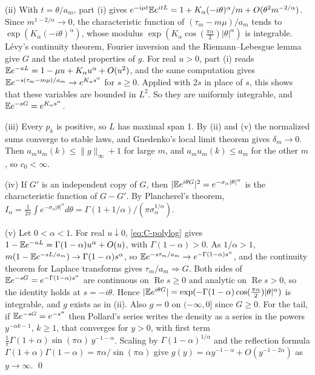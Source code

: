 (ii) With $t=\theta/a_m$, part (i) gives
$e^{-i\mu t}\mathbb{E} e^{itL}=1+K_\alpha(-i\theta)^\alpha/m+O(\theta^2m^{-2/\alpha})$.
Since $m^{1-2/\alpha}\to0$, the characteristic function of $(\tau_m-m\mu)/a_m$
tends to $\exp(K_\alpha(-i\theta)^\alpha)$, whose modulus
$\exp(K_\alpha\cos(\frac{\pi\alpha}2)\lvert\theta\rvert^\alpha)$ is
integrable. L\'evy's continuity theorem, Fourier inversion and the
Riemann--Lebesgue lemma give $G$ and the stated properties of $g$. For real
$u>0$, part (i) reads $\mathbb{E} e^{-uL}=1-\mu u+K_\alpha u^\alpha+O(u^2)$, and the
same computation gives $\mathbb{E} e^{-s(\tau_m-m\mu)/a_m}\to e^{K_\alpha s^\alpha}$
for $s\ge0$. Applied with $2s$ in place of $s$, this shows that these
variables are bounded in $L^2$. So they are uniformly integrable, and
$\mathbb{E} e^{-sG}=e^{K_\alpha s^\alpha}$.

(iii) Every $p_k$ is positive, so $L$ has maximal span 1. By (ii) and (v) the
normalized sums converge to stable laws, and Gnedenko's local limit theorem
\cite[Theorem~4.2.1]{ibragimovlinnik1971} gives $\delta_m\to0$. Then
$a_mu_m(k)\le\lVert g\rVert_\infty+1$ for large $m$, and $a_mu_m(k)\le a_m$
for the other $m$, so $c_0<\infty$.

(iv) If $G'$ is an independent copy of $G$, then
$\lvert\mathbb{E} e^{i\theta G}\rvert^2=e^{-\sigma_\alpha\lvert\theta\rvert^\alpha}$
is the characteristic function of $G-G'$. By Plancherel's theorem,
$I_\alpha=\frac1{2\pi}\int e^{-\sigma_\alpha\lvert\theta\rvert^\alpha}d\theta
=\Gamma(1+1/\alpha)/(\pi\sigma_\alpha^{1/\alpha})$.

(v) Let $0<\alpha<1$. For real $u\downarrow0$, \eqref{eq:C-polylog} gives
$1-\mathbb{E} e^{-uL}=\Gamma(1-\alpha)u^\alpha+O(u)$, with $\Gamma(1-\alpha)>0$. As
$1/\alpha>1$, $m(1-\mathbb{E} e^{-sL/a_m})\to\Gamma(1-\alpha)s^\alpha$, so
$\mathbb{E} e^{-s\tau_m/a_m}\to e^{-\Gamma(1-\alpha)s^\alpha}$, and the continuity
theorem for Laplace transforms gives $\tau_m/a_m\Rightarrow G$. Both sides of
$\mathbb{E} e^{-sG}=e^{-\Gamma(1-\alpha)s^\alpha}$ are continuous on
$\operatorname{Re}s\ge0$ and analytic on $\operatorname{Re}s>0$, so the
identity holds at $s=-i\theta$. Hence
$\lvert\mathbb{E} e^{i\theta G}\rvert=\exp(-\Gamma(1-\alpha)\cos(\frac{\pi\alpha}2)\lvert\theta\rvert^\alpha)$
is integrable, and $g$ exists as in (ii). Also $g=0$ on $(-\infty,0]$ since
$G\ge0$. For the tail, if $\mathbb{E} e^{-sG}=e^{-s^\alpha}$ then Pollard's series
\cite{pollard1946} writes the density as a series in the powers
$y^{-\alpha k-1}$, $k\ge1$, that converges for $y>0$, with first term
$\frac1\pi\Gamma(1+\alpha)\sin(\pi\alpha)\,y^{-1-\alpha}$. Scaling by
$\Gamma(1-\alpha)^{1/\alpha}$ and the reflection formula
$\Gamma(1+\alpha)\Gamma(1-\alpha)=\pi\alpha/\sin(\pi\alpha)$ give
$g(y)=\alpha y^{-1-\alpha}+O(y^{-1-2\alpha})$ as $y\to\infty$.
\qed

